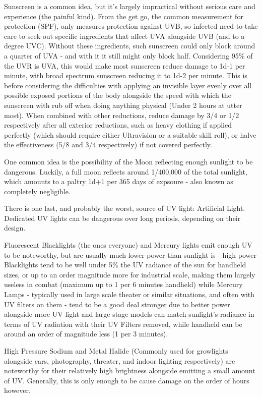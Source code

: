 \begin{multicols*}{3}
	Sunscreen is a common idea, but it's largely impractical without serious care and experience (the painful kind). From the get go, the common measurement for protection (SPF), only measures protection against UVB, so infected need to take care to seek out specific ingredients that affect UVA alongside UVB (and to a degree UVC). Without these ingredients, such sunscreen could only block around a quarter of UVA - and with it it still might only block half. Considering 95\% of the UVR is UVA, this would make most sunscreen reduce damage to 1d-1 per minute, with broad spectrum sunscreen reducing it to 1d-2 per minute. This is before considering the difficulties with applying an invisible layer evenly over all possible exposed portions of the body alongside the speed with which the sunscreen with rub off when doing anything physical (Under 2 hours at utter most). When combined with other reductions, reduce damage by 3/4 or 1/2 respectively after all exterior reductions, such as heavy clothing if applied perfectly (which should require either Ultravision or a suitable skill roll), or halve the effectiveness (5/8 and 3/4 respectively) if not covered perfectly.
			
	One common idea is the possibility of the Moon reflecting enough sunlight to be dangerous. Luckily, a full moon reflects around 1/400,000 of the total sunlight, which amounts to a paltry 1d+1 per 365 days of expsoure - also known as completely negligible.
	
	There is one last, and probably the worst, source of UV light: Artificial Light. Dedicated UV lights can be dangerous over long periods, depending on their design. 
	
	Fluorescent Blacklights (the ones everyone) and Mercury lights emit enough UV to be noteworthy, but are usually much lower power than sunlight is - high power Blacklights tend to be well under 5\% the UV radiance of the sun for handheld sizes, or up to an order magnitude more for industrial scale, making them largely useless in combat (maximum up to 1 per 6 minutes handheld) while Mercury Lamps - typically used in large scale theater or similar situations, and often with UV filters on them - tend to be a good deal stronger due to better power alongside more UV light and large stage models can match sunlight's radiance in terms of UV radiation with their UV Filters removed, while handheld can be around an order of magnitude less (1 per 3 minutes).
	
	High Pressure Sodium and Metal Halide (Commonly used for growlights alongside cars, photography, threater, and indoor lighting respectively) are noteworthy for their relatively high brightness alongside emitting a small amount of UV. Generally, this is only enough to be cause damage on the order of hours however.
	

\end{multicols*}
